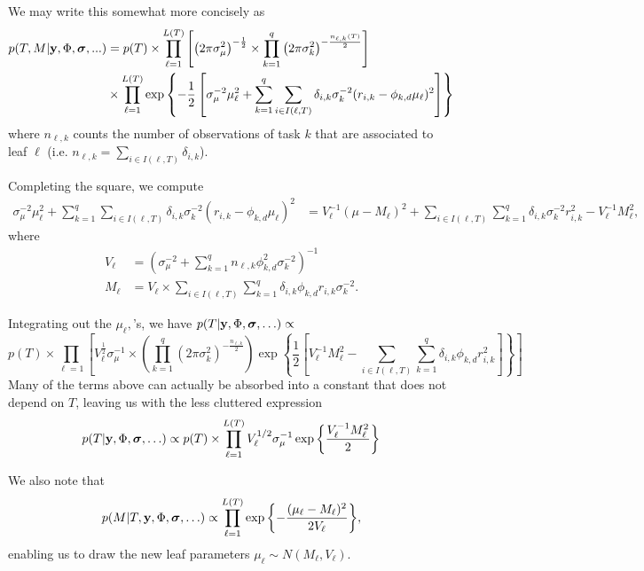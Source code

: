 \documentclass[12pt]{article}
\begin{document}
We may write this somewhat more concisely as
\begin{align*}
p(T,M | \mathbf{y}, \Phi, \boldsymbol{\sigma}, ... ) &= p(T) \times \prod_{\ell = 1}^{L(T)}{\left[\left(2\pi\sigma^{2}_{\mu}\right)^{-\frac{1}{2}} \times  \prod_{k = 1}^{q}{\left(2\pi\sigma^{2}_{k}\right)^{-\frac{n_{\ell,k}(T)}{2}}}\right]} \\
~& \times \prod_{\ell = 1}^{L(T)}{\exp\left\{-\frac{1}{2}\left[\sigma_{\mu}^{-2}\mu_{\ell}^{2} + \sum_{k = 1}^{q}{\sum_{i \in I(\ell,T)}{\delta_{i,k}\sigma^{-2}_{k}(r_{i,k} - \phi_{k,d}\mu_{\ell})^{2}}}\right]\right\}}
\end{align*}
where $n_{\ell,k}$ counts the number of observations of task $k$ that are associated to leaf $\ell$ (i.e. $n_{\ell,k} = \sum_{i \in I(\ell,T)}{\delta_{i,k}}$).

Completing the square, we compute
\begin{align*}
\sigma_{\mu}^{-2}\mu_{\ell}^{2} + \sum_{k = 1}^{q}{\sum_{i \in I(\ell,T)}{\delta_{i,k}\sigma^{-2}_{k}(r_{i,k} - \phi_{k,d}\mu_{\ell})^{2}}} &= V_{\ell}^{-1}(\mu - M_{\ell})^{2} + \sum_{i \in I(\ell,T)}{\sum_{k = 1}^{q}{\delta_{i,k}\sigma^{-2}_{k}r_{i,k}^{2}}} - V_{\ell}^{-1}M_{\ell}^{2},
\end{align*}
where
\begin{align*}
V_{\ell} &= \left(\sigma_{\mu}^{-2} + \sum_{k = 1}^{q}{n_{\ell,k}\phi_{k,d}^{2}\sigma^{-2}_{k}}\right)^{-1} \\
M_{\ell} &= V_{\ell} \times \sum_{i \in I(\ell,T)}{\sum_{k = 1}^{q}{\delta_{i,k}\phi_{k,d}r_{i,k}\sigma^{-2}_{k}}}.
\end{align*}

Integrating out the $\mu_{\ell},$'s, we have $p(T | \mathbf{y}, \Phi, \boldsymbol{\sigma}, \ldots) \propto $
$$
p(T) \times \prod_{\ell = 1}{\left[V_{\ell}^{\frac{1}{2}}\sigma_{\mu}^{-1} \times \left( \prod_{k = 1}^{q}{(2\pi\sigma^{2}_{k})^{-\frac{n_{\ell,k}}{2}}}\right)\exp\left\{\frac{1}{2}\left[V^{-1}_{\ell}M_{\ell}^{2} - \sum_{i \in I(\ell,T)}{\sum_{k = 1}^{q}{\delta_{i,k}\phi_{k,d}r_{i,k}^{2}}} \right] \right\}  \right]}
$$
Many of the terms above can actually be absorbed into a constant that does not depend on $T$, leaving us with the less cluttered expression
$$
p(T | \mathbf{y}, \Phi, \boldsymbol{\sigma}, \ldots) \propto p(T) \times \prod_{\ell = 1}^{L(T)}{V_{\ell}^{1/2}\sigma_{\mu}^{-1}\exp\left\{\frac{V^{-1}_{\ell}M_{\ell}^{2}}{2}\right\}}
$$

We also note that
$$
p(M | T, \mathbf{y}, \Phi, \boldsymbol{\sigma}, \ldots) \propto \prod_{\ell = 1}^{L(T)}{\exp\left\{-\frac{(\mu_{\ell} - M_{\ell})^{2}}{2V_{\ell}}\right\}},
$$
enabling us to draw the new leaf parameters $\mu_{\ell} \sim N(M_{\ell}, V_{\ell}).$
\end{document}
